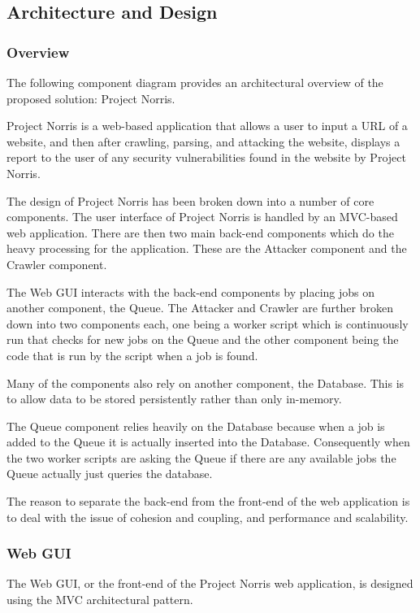 \documentclass[12pt,a4paper]{article}
\begin{document}
\subsection{Architecture and Design}

\subsubsection{Overview}
The following component diagram provides an architectural overview of the proposed solution: Project Norris.


Project Norris is a web-based application that allows a user to input a URL of a website, and then after crawling, parsing, and attacking the website, displays a report to the user of any security vulnerabilities found in the website by Project Norris.

The design of Project Norris has been broken down into a number of core components.  The user interface of Project Norris is handled by an MVC-based web application.  There are then two main back-end components which do the heavy processing for the application.  These are the Attacker component and the Crawler component.

The Web GUI interacts with the back-end components by placing jobs on another component, the Queue.
The Attacker and Crawler are further broken down into two components each, one being a worker script which is continuously run that checks for new jobs on the Queue and the other component being the code that is run by the script when a job is found.

Many of the components also rely on another component, the Database. This is to allow data to be stored persistently rather than only in-memory.

The Queue component relies heavily on the Database because when a job is added to the Queue it is actually inserted into the Database.  Consequently when the two worker scripts are asking the Queue if there are any available jobs the Queue actually just queries the database.

The reason to separate the back-end from the front-end of the web application is to deal with the issue of cohesion and coupling, and performance and scalability. 

\subsubsection{Web GUI}
The Web GUI, or the front-end of the Project Norris web application, is designed using the MVC architectural pattern.
\end{document}
